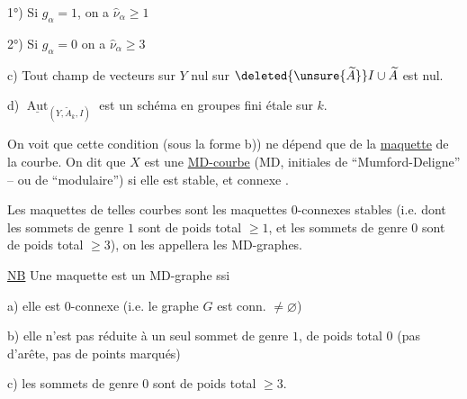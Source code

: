 1°) Si $g_\alpha=1$, on a $\widehat\nu_\alpha\geq1$

2°) Si $g_\alpha=0$ on a $\widehat\nu_\alpha\geq3$

c) Tout champ de vecteurs sur $Y$ nul sur $\deleted{\unsure{\widetilde A}}I\cup\widetilde A$ est nul.

d) $\underline{\operatorname{Aut}}_{(Y,\widetilde A_k,I)}$ est un schéma en groupes fini étale sur $k$.

On voit que cette condition (sous la forme b)) ne dépend que de la \uline{maquette} de la courbe. On dit que $X$ est une \uline{MD-courbe} (MD, initiales de ``Mumford-Deligne'' -- ou de ``modulaire'') si elle est stable, et connexe .

Les maquettes de telles courbes sont les maquettes $0$-connexes  stables (i.e. dont les sommets de genre $1$ sont de poids total $\geq1$, et les sommets de genre $0$ sont de poids total $\geq3$), on les appellera les MD-graphes.

\uline{NB} Une maquette est un MD-graphe ssi

a) elle est $0$-connexe (i.e. le graphe $G$ est conn. $\neq\varnothing$)

b) elle n'est pas réduite à un seul sommet de genre $1$, de poids total $0$ (pas d'arête, pas de points marqués)

c) les sommets de genre $0$ sont de poids total $\geq3$.
